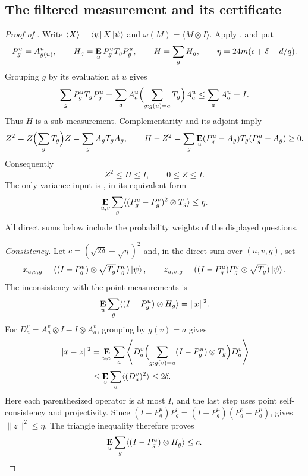 \documentclass[11pt]{article}
\theoremstyle{definition}
\newcommand{\E}{\mathop{\bf E\/}}
\newcommand{\eps}{\epsilon}
\begin{document}
\subsection{The filtered measurement and its certificate}

\begin{proof}[Proof of ]
Write $\langle X\rangle=\bra\psi X\ket\psi$ and
$\omega(M)=\langle M\otimes I\rangle$.  Apply
, and put
\[
 P_g^u=A^u_{g(u)},\qquad
 H_g=\E_u P_g^uT_gP_g^u,\qquad H=\sum_gH_g,
 \qquad\eta=24m(\eps+\delta+d/q).
\]
Grouping $g$ by its evaluation at $u$ gives
\[
 \sum_gP_g^uT_gP_g^u
 =\sum_aA_a^u\Bigl(\sum_{g:g(u)=a}T_g\Bigr)A_a^u
 \leq\sum_aA_a^u=I.
\]
Thus $H$ is a sub-measurement.  Complementarity and its adjoint imply
\[
 Z^2=Z\Bigl(\sum_gT_g\Bigr)Z
     =\sum_gA_gT_gA_g,
 \qquad
 H-Z^2=\sum_g\E_u(P_g^u-A_g)T_g(P_g^u-A_g)\geq0.
\]
Consequently
\begin{equation}\label{eq:self-improvement-certificate-contraction}
 Z^2\leq H\leq I,\qquad 0\leq Z\leq I.
\end{equation}
The only variance input is , in
its equivalent form
\begin{equation}\label{eq:self-improvement-variance-input}
 \E_{u,v}\sum_g\langle(P_g^u-P_g^v)^2\otimes T_g\rangle
 \leq\eta.
\end{equation}
All direct sums below include the probability weights of the displayed
questions.

\medskip\noindent\emph{Consistency.}
Let $c=(\sqrt{2\delta}+\sqrt\eta)^2$ and, in the direct sum over
$(u,v,g)$, set
\[
 x_{u,v,g}=((I-P_g^u)\otimes\sqrt{T_g}P_g^v)\ket\psi,
 \qquad
 z_{u,v,g}=((I-P_g^u)P_g^v\otimes\sqrt{T_g})\ket\psi.
\]
The inconsistency with the point measurements is
\[
 \E_u\sum_g\langle(I-P_g^u)\otimes H_g\rangle=\|x\|^2.
\]
For $D_a^v=A_a^v\otimes I-I\otimes A_a^v$, grouping by $g(v)=a$
gives
\begin{align*}
 \|x-z\|^2
 &=\E_{u,v}\sum_a\left\langle D_a^v
     \Bigl(\sum_{g:g(v)=a}(I-P_g^u)\otimes T_g\Bigr)D_a^v\right\rangle\\
 &\leq\E_v\sum_a\langle(D_a^v)^2\rangle\leq2\delta.
\end{align*}
Here each parenthesized operator is at most $I$, and the last step
uses point self-consistency and projectivity.  Since
$(I-P_g^u)P_g^v=(I-P_g^u)(P_g^v-P_g^u)$,
 gives $\|z\|^2\leq\eta$.
The triangle inequality therefore proves
\begin{equation}\label{eq:self-improvement-short-consistency}
 \E_u\sum_g\langle(I-P_g^u)\otimes H_g\rangle\leq c.
\end{equation}


\end{proof}
\end{document}
